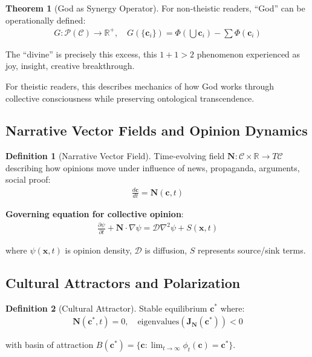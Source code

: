 \documentclass[11pt,a4paper]{article}
\theoremstyle{definition}
\newtheorem{definition}{Definition}[section]
\newtheorem{theorem}{Theorem}[section]
\theoremstyle{remark}
\newcommand{\RR}{\mathbb{R}}
\newcommand{\CC}{\mathcal{C}}
\newcommand{\cc}{\mathbf{c}}
\begin{document}
\begin{theorem}[God as Synergy Operator]
For non-theistic readers, ``God'' can be operationally defined:
\begin{align}
G: \mathcal{P}(\CC) \to \RR^+, \quad G(\{\cc_i\}) = \Phi\left(\bigcup \cc_i\right) - \sum \Phi(\cc_i)
\end{align}

The ``divine'' is precisely this excess, this \(1+1 > 2\) phenomenon experienced as joy, insight, creative breakthrough.

For theistic readers, this describes mechanics of how God works through collective consciousness while preserving ontological transcendence.
\end{theorem}

\subsection{Narrative Vector Fields and Opinion Dynamics}

\begin{definition}[Narrative Vector Field]
Time-evolving field \(\mathbf{N}: \CC \times \RR \to T\CC\) describing how opinions move under influence of news, propaganda, arguments, social proof:
\begin{align}
\frac{d\cc}{dt} = \mathbf{N}(\cc, t)
\end{align}
\end{definition}

\textbf{Governing equation for collective opinion}:
\begin{align}
\frac{\partial \psi}{\partial t} + \mathbf{N} \cdot \nabla \psi = \mathcal{D} \nabla^2 \psi + S(\mathbf{x}, t)
\end{align}

where \(\psi(\mathbf{x}, t)\) is opinion density, \(\mathcal{D}\) is diffusion, \(S\) represents source/sink terms.

\subsection{Cultural Attractors and Polarization}

\begin{definition}[Cultural Attractor]
Stable equilibrium \(\cc^*\) where:
\begin{align}
\mathbf{N}(\cc^*, t) = 0, \quad \text{eigenvalues}(\mathbf{J}_{\mathbf{N}}(\cc^*)) < 0
\end{align}

with basin of attraction \(B(\cc^*) = \{\cc : \lim_{t \to \infty} \phi_t(\cc) = \cc^*\}\).
\end{definition}
\end{document}
